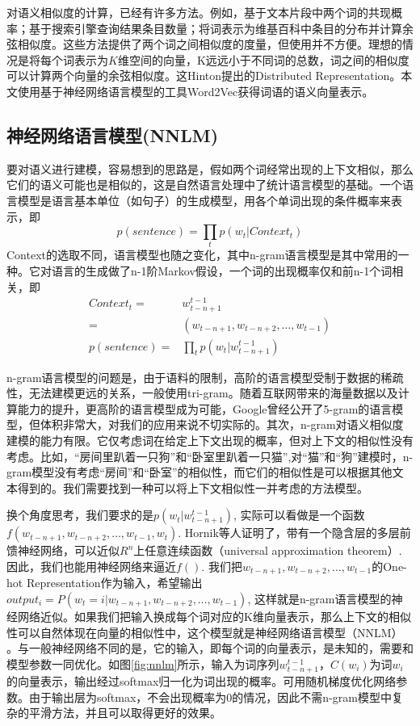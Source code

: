 对语义相似度的计算，已经有许多方法。例如，基于文本片段中两个词的共现概率\cite{jiang1997semantic}；基于搜索引擎查询结果条目数量\cite{bollegala2007measuring}；将词表示为维基百科中条目的分布并计算余弦相似度\cite{liu2009clustering}。这些方法提供了两个词之间相似度的度量，但使用并不方便。理想的情况是将每个词表示为$K$维空间的向量，K远远小于不同词的总数，词之间的相似度可以计算两个向量的余弦相似度。这Hinton提出的Distributed Representation\cite{hinton1986learning}。本文使用基于神经网络语言模型的工具Word2Vec获得词语的语义向量表示。

\subsection{神经网络语言模型(NNLM)}
要对语义进行建模，容易想到的思路是，假如两个词经常出现的上下文相似，那么它们的语义可能也是相似的，这是自然语言处理中了统计语言模型的基础。一个语言模型是语言基本单位（如句子）的生成模型，用各个单词出现的条件概率来表示，即
\[
p(sentence) = \prod\limits_t {p({w_t}|Context_t)}
\]
Context的选取不同，语言模型也随之变化，其中n-gram语言模型是其中常用的一种。它对语言的生成做了n-1阶Markov假设，一个词的出现概率仅和前n-1个词相关，即
\begin{align*}
Context_t = & w_{t-n+1}^{t-1} \\
		= & (w_{t-n+1}, w_{t-n+2}, \ldots, w_{t-1}) \\
p(sentence) = & \prod\limits_t {p({w_t}|w_{t-n+1}^{t-1})}
\end{align*}

n-gram语言模型的问题是，由于语料的限制，高阶的语言模型受制于数据的稀疏性，无法建模更远的关系，一般使用tri-gram。随着互联网带来的海量数据以及计算能力的提升，更高阶的语言模型成为可能，Google曾经公开了5-gram的语言模型，但体积非常大，对我们的应用来说不切实际的。其次，n-gram对语义相似度建模的能力有限。它仅考虑词在给定上下文出现的概率，但对上下文的相似性没有考虑。比如，``房间里趴着一只狗''和``卧室里趴着一只猫'',对``猫''和``狗''建模时，n-gram模型没有考虑``房间''和``卧室''的相似性，而它们的相似性是可以根据其他文本得到的。我们需要找到一种可以将上下文相似性一并考虑的方法模型。

换个角度思考，我们要求的是$p({w_t}|w_{t-n+1}^{t-1})$, 实际可以看做是一个函数$f(w_{t-n+1}, w_{t-n+2}, \ldots, w_{t-1}, w_t)$. Hornik等人证明了，带有一个隐含层的多层前馈神经网络，可以近似$R^n$上任意连续函数（universal approximation theorem\cite{hornik1991approximation}）. 因此，我们也能用神经网络来逼近$f()$. 我们把$w_{t-n+1}, w_{t-n+2}, \ldots, w_{t-1}$的One-hot Representation作为输入，希望输出$output_i=P(w_t=i|w_{t-n+1}, w_{t-n+2}, \ldots, w_{t-1})$, 这样就是n-gram语言模型的神经网络近似。如果我们把输入换成每个词对应的K维向量表示，那么上下文的相似性可以自然体现在向量的相似性中，这个模型就是神经网络语言模型（NNLM）\cite{bengio2006neural} \cite{mikolov2013efficient}。与一般神经网络不同的是，它的输入，即每个词的向量表示，是未知的，需要和模型参数一同优化。如图\ref{fig:nnlm}所示，输入为词序列$w_{t-n+1}^{t-1}$，$C(w_i)$为词$w_i$的向量表示，输出经过softmax归一化为词出现的概率。可用随机梯度优化网络参数。由于输出层为softmax，不会出现概率为0的情况，因此不需n-gram模型中复杂的平滑方法，并且可以取得更好的效果。

